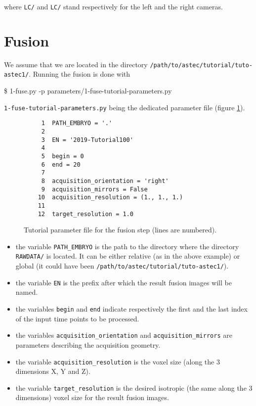 where \texttt{LC/} and \texttt{LC/} stand respectively for the left
and the right cameras.





\section{Fusion}
\label{sec:tutorial:fusion}

We assume that we are located in the directory
\texttt{/path/to/astec/tutorial/tuto-astec1/}. Running the fusion is
done with
\begin{code}{0.8}
  \$ 1-fuse.py -p parameters/1-fuse-tutorial-parameters.py
\end{code}
\texttt{1-fuse-tutorial-parameters.py} being the dedicated parameter file  (figure \ref{fig:tutorial:parameter:fusion}).

\begin{figure}
\begin{framed}
\begin{verbatim}
     1	PATH_EMBRYO = '.'
     2	
     3	EN = '2019-Tutorial100'
     4	
     5	begin = 0
     6	end = 20
     7	
     8	acquisition_orientation = 'right'
     9	acquisition_mirrors = False
    10	acquisition_resolution = (1., 1., 1.)
    11	
    12	target_resolution = 1.0
\end{verbatim}
\end{framed}
\caption{\label{fig:tutorial:parameter:fusion} Tutorial parameter file
  for the fusion step (lines are numbered).}
\end{figure}

\begin{itemize}
  \itemsep -1ex
  \item the variable \texttt{PATH\_EMBRYO} is the path to the directory where
    the directory \texttt{RAWDATA/} is located. It can be either relative (as in the
    above example) or
    global (it could have been \texttt{/path/to/astec/tutorial/tuto-astec1/}).
  \item the variable \texttt{EN} is the prefix after which the result fusion images
    will be named. 
  \item the variables \texttt{begin} and \texttt{end} indicate respectively the
    first and the last index of the input time points to be processed.
  \item the variables \texttt{acquisition\_orientation} and \texttt{acquisition\_mirrors} are parameters
    describing the acquisition geometry.
  \item the variable \texttt{acquisition\_resolution} is the voxel size (along the 3
    dimensions X, Y and Z).
  \item the variable \texttt{target\_resolution} is the desired isotropic (the
    same along the 3 dimensions) voxel size for the result fusion images.
\end{itemize}

